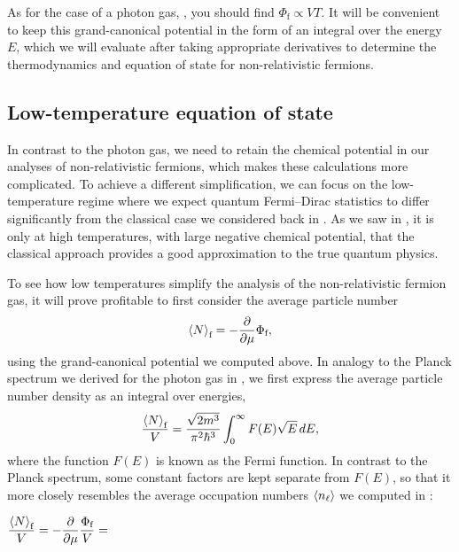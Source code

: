 As for the case of a photon gas, , you should find $\Phi_{\text{f}} \propto VT$.
It will be convenient to keep this grand-canonical potential in the form of an integral over the energy $E$, which we will evaluate after taking appropriate derivatives to determine the thermodynamics and equation of state for non-relativistic fermions.



\subsection{\label{sec:fermi_lowT}Low-temperature equation of state}
In contrast to the photon gas, we need to retain the chemical potential in our analyses of non-relativistic fermions, which makes these calculations more complicated.
To achieve a different simplification, we can focus on the low-temperature regime where we expect quantum Fermi--Dirac statistics to differ significantly from the classical case we considered back in .
As we saw in , it is only at high temperatures, with large negative chemical potential, that the classical approach provides a good approximation to the true quantum physics.

To see how low temperatures simplify the analysis of the non-relativistic fermion gas, it will prove profitable to first consider the average particle number
\begin{equation*}
  \left\langle N \right\rangle_{\text{f}} = -\frac{\partial }{\partial \mu} \Phi_{\text{f}},
\end{equation*}
using the grand-canonical potential we computed above.
In analogy to the Planck spectrum we derived for the photon gas in , we first express the average particle number density as an integral over energies,
\begin{equation}
  \label{eq:N_fermi}
  \frac{\left\langle N \right\rangle_{\text{f}}}{V} = \frac{\sqrt{2m^3}}{\pi^2 \hbar^3} \int_0^{\infty} F(E) \sqrt{E} \mathop{dE},
\end{equation}
where the function $F(E)$ is known as the Fermi function.
In contrast to the Planck spectrum, some constant factors are kept separate from $F(E)$, so that it more closely resembles the average occupation numbers $\left\langle n_{\ell} \right\rangle$ we computed in :
\begin{mdframed}
  $\displaystyle \frac{\left\langle N \right\rangle_{\text{f}}}{V} = -\frac{\partial }{\partial \mu} \frac{\Phi_{\text{f}}}{V} = $ \\[130 pt]
\end{mdframed}

